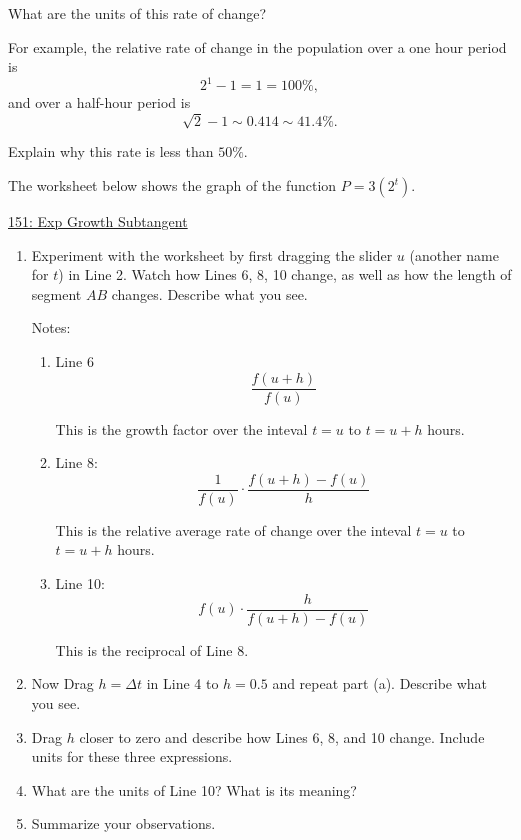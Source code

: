 \documentclass{ximera}
\begin{document}
\begin{question} \label{QODFERerre}
What are the units of this rate of change?
\end{question}

For example, the relative rate of change in the population over a one hour period is
\[ 
        2^1 - 1 = 1 = 100\%,
\]
and over a half-hour period is
\[
    \sqrt{2} - 1 \sim 0.414 \sim 41.4\%.
\]

\begin{question} \label{QERdftrre}
Explain why this rate is less than $50\%$.
\end{question}

\begin{exploration} \label{EKDFeredfM}
The worksheet below shows the graph of the function $P=3(2^t)$. 

\href{https://www.desmos.com/calculator/zu0f4jnh4a}{151: Exp Growth Subtangent}

 
\begin{onlineOnly}
    \begin{center}
\end{center}
\end{onlineOnly}


\begin{enumerate}
\item Experiment with the worksheet by first dragging the slider $u$ (another name for $t$) in Line 2. Watch how Lines 6, 8, 10 change, as well as how the length of segment $AB$ changes. Describe what you see.

Notes:

\begin{enumerate}
\item Line 6
\[
\frac{f(u+h)}{f(u)}
\]

This is the growth factor over the inteval $t=u$ to $t=u+h$ hours.

\item Line 8: 
\[
    \frac{1}{f(u)}\cdot \frac{f(u+h)-f(u)}{h}
\]

This is the relative average rate of change over the inteval $t=u$ to $t=u+h$ hours.

\item Line 10:
\[
    f(u) \cdot \frac{h}{f(u+h)-f(u)}
\]

This is the reciprocal of Line 8.
\end{enumerate}


\item Now Drag $h=\Delta t$ in Line 4 to $h=0.5$ and repeat part (a). Describe what you see.

\item Drag $h$ closer to zero and describe how Lines 6, 8, and 10 change. Include units for these three expressions.

\item What are the units of Line 10? What is its meaning?

\item Summarize your observations.

\end{enumerate}
\end{exploration}
\end{document}
